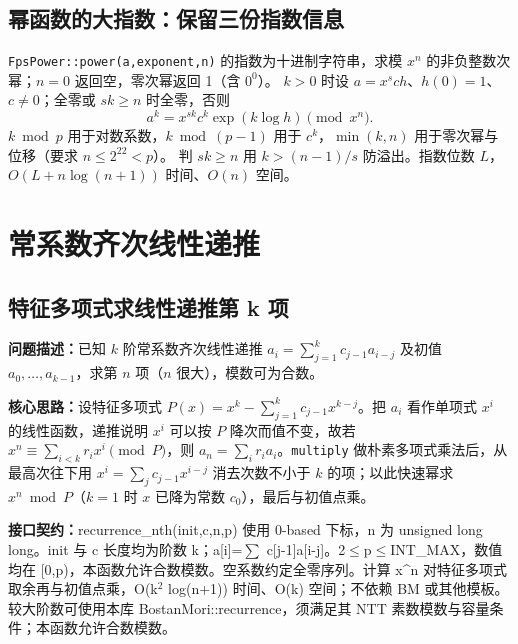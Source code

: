\subsection{幂函数的大指数：保留三份指数信息}\label{knowledge-poly-power}
\texttt{FpsPower::power(a,exponent,n)} 的指数为十进制字符串，求模 $x^n$ 的非负整数次幂；$n=0$ 返回空，零次幂返回 1（含 $0^0$）。
$k>0$ 时设 $a=x^sch$、$h(0)=1$、$c\ne0$；全零或 $sk\ge n$ 时全零，否则
\[
 a^k=x^{sk}c^k\exp(k\log h)\pmod{x^n}.
\]
$k\bmod p$ 用于对数系数，$k\bmod(p-1)$ 用于 $c^k$，$\min(k,n)$ 用于零次幂与位移（要求 $n\le2^{22}<p$）。
判 $sk\ge n$ 用 $k>(n-1)/s$ 防溢出。指数位数 $L$，$O(L+n\log(n+1))$ 时间、$O(n)$ 空间。


\Needspace{180pt}

\section{常系数齐次线性递推}

\subsection{特征多项式求线性递推第 k 项}\label{compact-recurrence_nth}

\noindent\textbf{问题描述：}\allowbreak 已知 $k$ 阶常系数齐次线性递推 $a_i=\sum_{j=1}^{k}c_{j-1}a_{i-j}$ 及初值 $a_0,\dots,a_{k-1}$，求第 $n$ 项（$n$ 很大），模数可为合数。

\textbf{核心思路：}\allowbreak 设特征多项式 $P(x)=x^k-\sum_{j=1}^{k}c_{j-1}x^{k-j}$。把 $a_i$ 看作单项式 $x^i$ 的线性函数，递推说明 $x^i$ 可以按 $P$ 降次而值不变，故若 $x^n\equiv\sum_{i<k}r_ix^i\pmod P$，则 $a_n=\sum_i r_ia_i$。\texttt{multiply} 做朴素多项式乘法后，从最高次往下用 $x^i=\sum_j c_{j-1}x^{i-j}$ 消去次数不小于 $k$ 的项；以此快速幂求 $x^n\bmod P$（$k=1$ 时 $x$ 已降为常数 $c_0$），最后与初值点乘。



{\sloppy{}\noindent\textbf{接口契约：}recurrence\_nth(init,c,n,p) 使用 0-based 下标，n 为 unsigned long long。init 与 c 长度均为阶数 k；a[i]=$\sum$ c[j-1]a[i-j]。2$\le$p$\le$INT\_MAX，数值均在 [0,p)，本函数允许合数模数。空系数约定全零序列。计算 x\textasciicircum{}n 对特征多项式取余再与初值点乘，O(k$^{2}$ log(n+1)) 时间、O(k) 空间；不依赖 BM 或其他模板。较大阶数可使用本库 BostanMori::recurrence，须满足其 NTT 素数模数与容量条件；本函数允许合数模数。\par}



